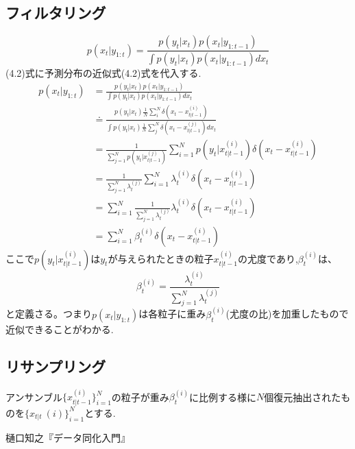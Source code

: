 \documentclass[dvipdfmx,uplatex,10pt]{jsarticle}
\begin{document}
\subsection{フィルタリング}
\begin{equation}
  p(x_{t}|y_{1:t})=\frac{p(y_{t}|x_{t})p(x_{t}|y_{1:t-1})}{\int p(y_{t}|x_{t})p(x_{t}|y_{1:t-1})dx_{t}}
\end{equation}
(4.2)式に予測分布の近似式(4.2)式を代入する.
\begin{align}
  p(x_{t}|y_{1:t})
  &=\frac{p(y_{t}|x_{t})p(x_{t}|y_{1:t-1})}{\int p(y_{t}|x_{t})p(x_{t}|y_{1:t-1})dx_{t}}\nonumber\\
  &\doteq \frac{p(y_{t}|x_{t})\frac{1}{N}\sum_{i}^{N}\delta(x_{t}-x_{t|t-1}^{(i)})}{\int p(y_{t}|x_{t})\frac{1}{N}\sum_{j}^{N}\delta(x_{t}-x_{t|t-1}^{(j)})dx_{t}}\nonumber\\
  &=\frac{1}{\sum_{j=1}^{N}p(y_{t}|x_{t|t-1}^{(j)})}\sum_{i=1}^{N}p(y_{t}|x_{t|t-1}^{(i)})\delta(x_{t}-x_{t|t-1}^{(i)})\nonumber\\
  &=\frac{1}{\sum_{j=1}^{N}\lambda_{t}^{(j)}}\sum_{i=1}^{N}\lambda_{t}^{(i)}\delta(x_{t}-x_{t|t-1}^{(i)})\nonumber\\
  &=\sum_{i=1}^{N}\frac{1}{\sum_{j=1}^{N}\lambda_{t}^{(j)}}\lambda_{t}^{(i)}\delta(x_{t}-x_{t|t-1}^{(i)})\nonumber\\
  &=\sum_{i=1}^{N}\beta_{t}^{(i)}\delta(x_{t}-x_{t|t-1}^{(i)})
\end{align}
ここで$p(y_{t}|x_{t|t-1}^{(i)})$は$y_{t}$が与えられたときの粒子$x_{t|t-1}^{(i)}$の尤度であり,$\beta_{t}^{(i)}$は、
\begin{equation}
 \beta_{t}^{(i)} = \frac{\lambda_{t}^{(i)}}{\sum_{j=1}^{N}\lambda_{t}^{(j)}}
\end{equation}
と定義さる。つまり$p(x_{t}|y_{1:t})$は各粒子に重み$\beta_{t}^{(i)}$(尤度の比)を加重したもので近似できることがわかる.
\subsection{リサンプリング}
アンサンブル$\{x_{t|t-1}^{(i)}\}_{i=1}^{N}$の粒子が重み$\beta_{t}^{(i)}$に比例する様に$N$個復元抽出されたものを$\{x_{t|t}~{(i)}\}_{i=1}^{N}$とする.
\newpage
\begin{thebibliography}{5}
  樋口知之『データ同化入門』
\end{thebibliography}
\end{document}
